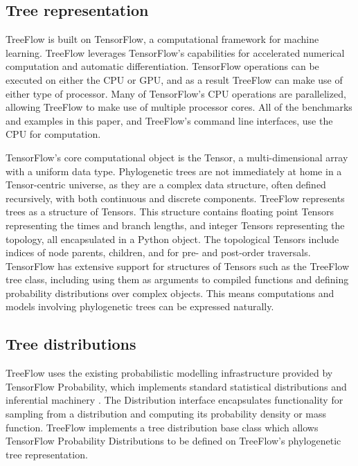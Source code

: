 \documentclass[oupdraft]{sysbio_sse}
\let\cite\citep
\begin{document}
\subsection{Tree representation}

TreeFlow is built on TensorFlow, a computational framework for machine learning. TreeFlow leverages TensorFlow's capabilities for accelerated numerical computation and automatic differentiation. TensorFlow operations can be executed on either the CPU or GPU, and as a result TreeFlow can make use of either type of processor. Many of TensorFlow's CPU operations are parallelized, allowing TreeFlow to make use of multiple processor cores. All of the benchmarks and examples in this paper, and TreeFlow's command line interfaces, use the CPU for computation.

TensorFlow's core computational object is the Tensor, a multi-dimensional array with a uniform data type. Phylogenetic trees are not immediately at home in a Tensor-centric universe, as they are a complex data structure, often defined recursively, with both continuous and discrete components. TreeFlow represents trees as a structure of Tensors. This structure contains floating point Tensors representing the times and branch lengths, and integer Tensors representing the topology, all encapsulated in a Python object. The topological Tensors include indices of node parents, children, and for pre- and post-order traversals. TensorFlow has extensive support for structures of Tensors such as the TreeFlow tree class, including using them as arguments to compiled functions and defining probability distributions over complex objects. This means computations and models involving phylogenetic trees can be expressed naturally.

\subsection{Tree distributions}
\label{treepriors}

TreeFlow uses the existing probabilistic modelling infrastructure provided by TensorFlow Probability, which implements standard statistical distributions and inferential machinery \cite{dillon2017tensorflow}. The Distribution interface encapsulates functionality for sampling from a distribution and computing its probability density or mass function. TreeFlow implements a tree distribution base class which allows TensorFlow Probability Distributions to be defined on TreeFlow's phylogenetic tree representation.
\end{document}
